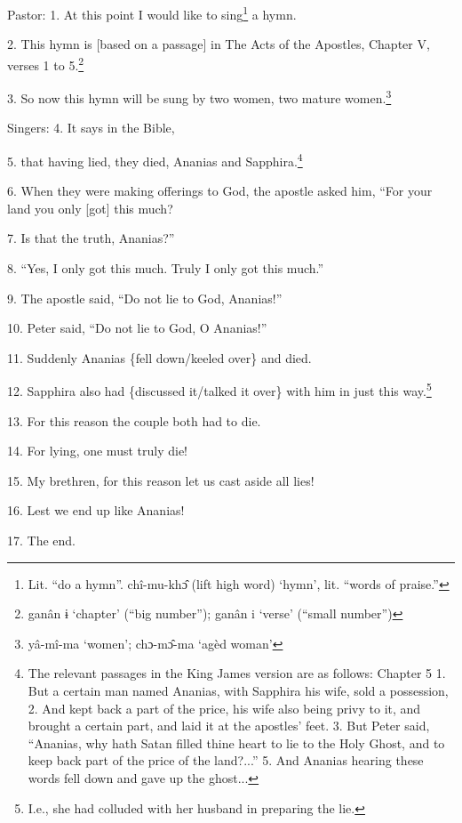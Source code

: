 
Pastor: 1. At this point I would like to sing\footnote{Lit. ``do a hymn''. chî-mu-khɔ̂ (lift high word) `hymn', lit. ``words of praise.''} a hymn.

2. This hymn is [based on a passage] in The Acts of the Apostles, Chapter V, verses
1 to 5.\footnote{ganân ɨ `chapter' (``big number''); ganân i `verse' (``small number'')}

3. So now this hymn will be sung by two women, two mature women.\footnote{yâ-mî-ma `women'; chɔ-mɔ̂-ma `agèd woman'}

Singers: 4. It says in the Bible,

5. that having lied, they died, Ananias and Sapphira.\footnote{The relevant passages in the King James version are as follows:  Chapter 5  1. But a certain man named Ananias, with Sapphira his wife, sold a possession,  2. And kept back a part of the price, his wife also being privy to it, and brought a certain part, and laid it at the apostles' feet.  3. But Peter said, ``Ananias, why hath Satan filled thine heart to lie to the Holy Ghost, and to keep back part of the price of the land?...''  5. And Ananias hearing these words fell down and gave up the ghost...}

6. When they were making offerings to God, the apostle asked him, ``For your land
you only [got] this much?

7. Is that the truth, Ananias?''

8. ``Yes, I only got this much. Truly I only got this much.''

9. The apostle said, ``Do not lie to God, Ananias!''

10. Peter said, ``Do not lie to God, O Ananias!''

11. Suddenly Ananias \{fell down/keeled over\} and died.

12. Sapphira also had \{discussed it/talked it over\} with him in just this way.\footnote{I.e., she had colluded with her husband in preparing the lie.}

13. For this reason the couple both had to die.

14. For lying, one must truly die!

15. My brethren, for this reason let us cast aside all lies!

16. Lest we end up like Ananias!

17. The end.

